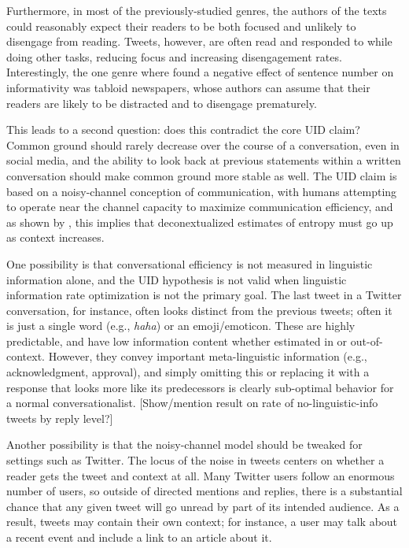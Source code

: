 \documentclass[11pt,letterpaper]{article}
\begin{document}
Furthermore, in most of the previously-studied genres, the authors of the texts could reasonably expect their readers to be both focused and unlikely to disengage from reading. Tweets, however, are often read and responded to while doing other tasks, reducing focus and increasing disengagement rates.  Interestingly, the one genre where  found a negative effect of sentence number on informativity was tabloid newspapers, whose authors can assume that their readers are likely to be distracted and to disengage prematurely.

This leads to a second question: does this contradict the core UID claim?  Common ground should rarely decrease over the course of a conversation, even in social media, and the ability to look back at previous statements within a written conversation should make common ground more stable as well.  The UID claim is based on a noisy-channel conception of communication, with humans attempting to operate near the channel capacity to maximize communication efficiency, and as shown by , this implies that deconextualized estimates of entropy must go up as context increases.

One possibility is that conversational efficiency is not measured in linguistic information alone, and the UID hypothesis is not valid when linguistic information rate optimization is not the primary goal.  The last tweet in a Twitter conversation, for instance, often looks distinct from the previous tweets; often it is just a single word (e.g., {\it haha}) or an emoji/emoticon.  These are highly predictable, and have low information content whether estimated in or out-of-context.  However, they convey important meta-linguistic information (e.g., acknowledgment, approval), and simply omitting this or replacing it with a response that looks more like its predecessors is clearly sub-optimal behavior for a normal conversationalist.  [Show/mention result on rate of no-linguistic-info tweets by reply level?]

Another possibility is that the noisy-channel model should be tweaked for settings such as Twitter.  The locus of the noise in tweets centers on whether a reader gets the tweet and context at all.  Many Twitter users follow an enormous number of users, so outside of directed mentions and replies, there is a substantial chance that any given tweet will go unread by part of its intended audience. As a result, tweets may contain their own context; for instance, a user may talk about a recent event and include a link to an article about it.
\end{document}
